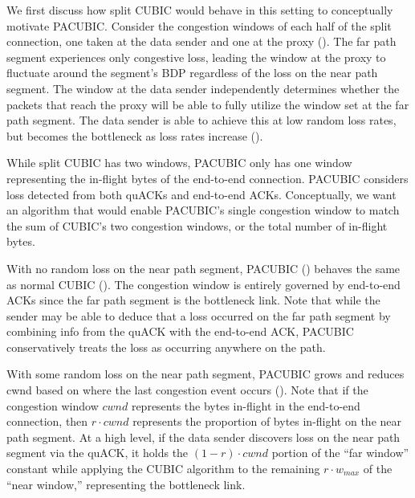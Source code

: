 We first discuss how split CUBIC would behave in this setting to conceptually
motivate PACUBIC.
Consider the congestion windows of each half of the
split connection, one taken at the data sender and one at the proxy
().
The far path segment experiences only congestive loss,
leading the window at the proxy to fluctuate around the segment's BDP
regardless of the loss on the near path segment.
The window at the data sender independently determines whether the packets
that reach the proxy will be able to fully utilize the window set at the far
path segment. The data sender is able to achieve this at low random loss rates, but
becomes the bottleneck as loss rates increase ().

While split CUBIC has two windows, PACUBIC only has one
window representing the in-flight bytes of the end-to-end connection.
PACUBIC considers loss detected from both quACKs and end-to-end ACKs.
Conceptually, we want an algorithm that would enable PACUBIC's single
congestion window to match the sum of CUBIC's two congestion windows, or
the total number of in-flight bytes.

With no random loss on the near path segment, PACUBIC ()
behaves the same as normal CUBIC ().
The congestion window is entirely governed by end-to-end ACKs since
the far path segment is the bottleneck link. Note that while the sender may be
able to deduce that a loss occurred on the far path segment by combining info from
the quACK with the end-to-end ACK, PACUBIC conservatively treats the loss as
occurring anywhere on the path.

With some random loss on the near path segment, PACUBIC grows and reduces cwnd
based on where the last congestion event occurs ().
Note that if the congestion window $cwnd$
represents the bytes in-flight in the end-to-end connection, then
$r \cdot cwnd$ represents the proportion of bytes in-flight on the near
path segment. At a high level, if the data sender discovers loss
on the near path segment via the quACK, it holds the $(1-r)\cdot cwnd$ portion of
the ``far window'' constant while applying the CUBIC algorithm to the remaining
$r \cdot w_{max}$ of the ``near window,'' representing the bottleneck link.

